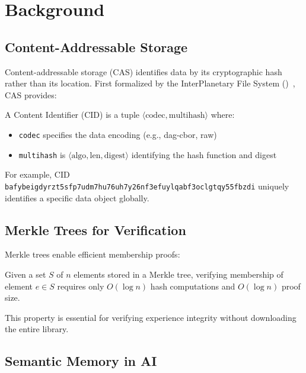 \section{Background}


\subsection{Content-Addressable Storage}

Content-addressable storage (CAS) identifies data by its cryptographic hash rather than its location. First formalized by the InterPlanetary File System (\IPFS{})~\cite{benet2014ipfs}, CAS provides:

\begin{definition}
A Content Identifier (CID) is a tuple $\langle \text{codec}, \text{multihash} \rangle$ where:
\begin{itemize}
    \item \texttt{codec} specifies the data encoding (e.g., dag-cbor, raw)
    \item \texttt{multihash} is $\langle \text{algo}, \text{len}, \text{digest} \rangle$ identifying the hash function and digest
\end{itemize}
\end{definition}

For example, CID \texttt{bafybeigdyrzt5sfp7udm7hu76uh7y26nf3efuylqabf3oclgtqy55fbzdi} uniquely identifies a specific data object globally.

\subsection{Merkle Trees for Verification}

Merkle trees enable efficient membership proofs:

\begin{theorem}
Given a set $S$ of $n$ elements stored in a Merkle tree, verifying membership of element $e \in S$ requires only $O(\log n)$ hash computations and $O(\log n)$ proof size.
\end{theorem}

This property is essential for verifying experience integrity without downloading the entire library.

\subsection{Semantic Memory in AI}

